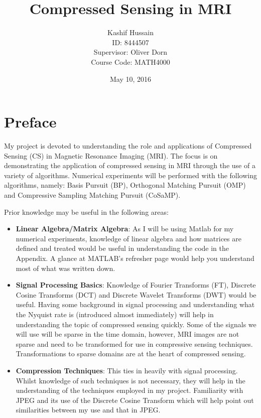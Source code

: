 \documentclass[titlepage,oneside, 12pt]{book}
\theoremstyle{break}
\begin{document}
\sloppy
\title{Compressed Sensing in MRI}
\author{Kashif Hussain \\ ID: 8444507 \\ Supervisor: Oliver Dorn \\ Course Code: MATH4000}
\date{May 10, 2016}
\maketitle


\tableofcontents

\chapter*{Preface}
My project is devoted to understanding the role and applications of Compressed Sensing (CS) in Magnetic Resonance Imaging (MRI). The focus is on demonstrating the application of compressed sensing in  MRI through the use of a variety of algorithms. Numerical experiments will be performed with the following algorithms, namely: Basis Pursuit (BP), Orthogonal Matching Pursuit (OMP) and Compressive Sampling Matching Pursuit (CoSaMP). 

Prior knowledge may be useful in the following areas:
\begin{itemize}
\item \textbf{Linear Algebra/Matrix Algebra}:
As I will be using Matlab for my numerical experiments, knowledge of linear algebra and how matrices are defined and treated would be useful in understanding the code in the Appendix. A glance at MATLAB's refresher page would help you understand most of what was written down. 


\item \textbf{Signal Processing Basics}:
Knowledge of Fourier Transforms (FT), Discrete Cosine Transforms (DCT) and Discrete Wavelet Transforms (DWT) would be useful. Having some background in signal processing and understanding what the Nyquist rate is (introduced almost immediately) will help in understanding the topic of compressed sensing quickly. Some of the signals we will use will be sparse in the time domain, however, MRI images are not sparse and need to be transformed for use in compressive sensing techniques. Transformations to sparse domains are at the heart of compressed sensing. 

\item \textbf{Compression Techniques}:
This ties in heavily with signal processing. Whilst knowledge of such techniques is not necessary, they will help in the understanding of the techniques employed in my project. Familiarity with JPEG and its use of the Discrete Cosine Transform which will help point out similarities between my use and that in JPEG.

\end{itemize}
\end{document}
